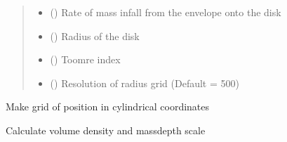 \documentclass[a4paper,11pt,english]{sphinxmanual}
\begin{document}
\begin{fulllineitems}
\begin{fulllineitems}
\begin{quote}
\begin{description}
\begin{itemize}
\item {} 
\sphinxAtStartPar
{} () \textendash{} Rate of mass infall from the envelope onto the disk

\item {} 
\sphinxAtStartPar
{} () \textendash{} Radius of the disk

\item {} 
\sphinxAtStartPar
{} () \textendash{} Toomre index

\item {} 
\sphinxAtStartPar
{} () \textendash{} Resolution of radius grid (Default = 500)

\end{itemize}

\end{description}\end{quote}

\end{fulllineitems}


\begin{fulllineitems}
\label{\detokenize{vertical:spherical_x22.DiskModel_spherical.make_position_map}}
\pysigstartsignatures
\pysiglinewithargsret
{}
{}
{}
\pysigstopsignatures
\sphinxAtStartPar
Make grid of position in cylindrical coordinates

\end{fulllineitems}


\begin{fulllineitems}
\label{\detokenize{vertical:spherical_x22.DiskModel_spherical.make_rho_and_m_map}}
\pysigstartsignatures
\pysiglinewithargsret
{}
{}
{}
\pysigstopsignatures
\sphinxAtStartPar
Calculate volume density and mass\sphinxhyphen{}depth scale


\end{fulllineitems}
\end{fulllineitems}
\end{document}
